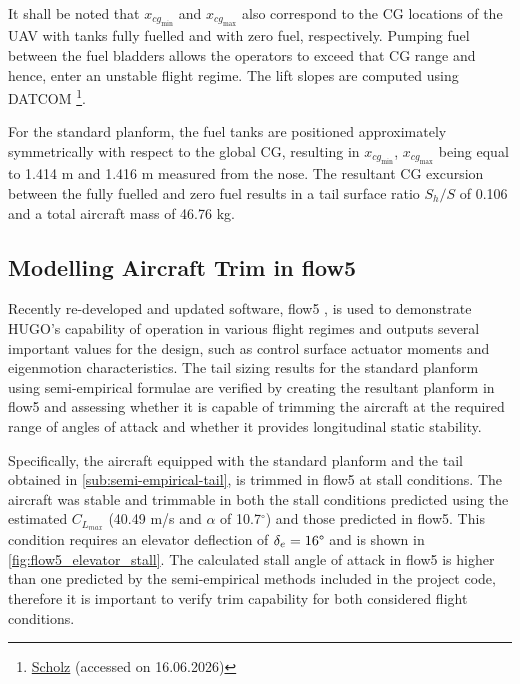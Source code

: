 It shall be noted that $x_{cg_\text{min}}$ and  $x_{cg_\text{max}}$ also correspond to the CG locations of the UAV with tanks fully fuelled and with zero fuel, respectively. Pumping fuel between the fuel bladders  allows the operators to exceed that CG range and hence, enter an unstable flight regime. The lift slopes are computed using DATCOM \footnote{\href{https://www.fzt.haw-hamburg.de/pers/Scholz/HOOU/AircraftDesign_7_WingDesign.pdf}{Scholz} (accessed on 16.06.2026)}. 

For the standard planform, the fuel tanks are positioned approximately symmetrically with respect to the global CG, resulting in $x_{{cg}_\text{min}}$, $x_{{cg}_\text{max}}$ being equal to 1.414 m and 1.416 m measured from the nose. The resultant CG excursion between the fully fuelled and zero fuel results in a tail surface ratio $S_h/S$ of 0.106 and a total aircraft mass of 46.76 kg.

\subsection{Modelling Aircraft Trim in flow5}
Recently re-developed and updated software, flow5 , is used to demonstrate HUGO's capability of operation in various flight regimes and outputs several important values for the design, such as control surface actuator moments and eigenmotion characteristics. The tail sizing results for the standard planform using semi-empirical formulae are verified by creating the resultant planform in flow5 and assessing whether it is capable of trimming the aircraft at the required range of angles of attack and whether it provides longitudinal static stability. 

Specifically, the aircraft equipped with the standard planform and the tail obtained in \autoref{sub:semi-empirical-tail}, is trimmed in flow5 at stall conditions. The aircraft was stable and trimmable in both the stall conditions predicted using the estimated $C_{L_{max}}$ (40.49 m/s and $\alpha$ of 10.7$^\circ$) and those predicted in flow5. This condition requires an elevator deflection of $\delta_e = 16 \degree$ and is shown in \autoref{fig:flow5_elevator_stall}. The calculated stall angle of attack in flow5 is higher than one predicted by the semi-empirical methods included in the project code, therefore it is important to verify trim capability for both considered flight conditions.


